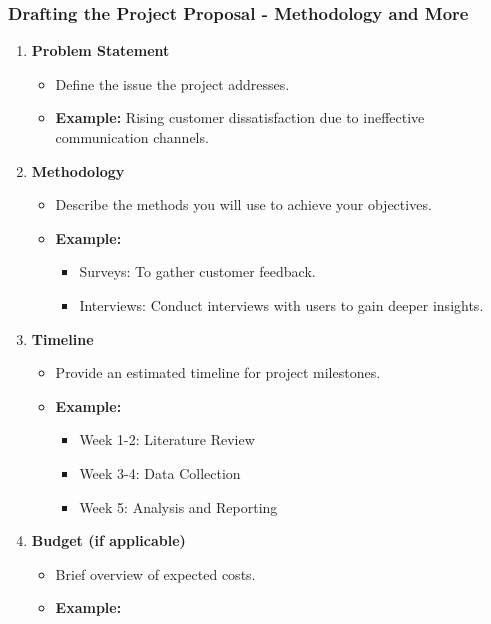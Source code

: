 \documentclass[aspectratio=169]{beamer}
\begin{document}
\begin{frame}[fragile]
    \frametitle{Drafting the Project Proposal - Methodology and More}
    \begin{enumerate}[resume]
        \item \textbf{Problem Statement}
            \begin{itemize}
                \item Define the issue the project addresses.
                \item \textbf{Example:} Rising customer dissatisfaction due to ineffective communication channels.
            \end{itemize}
        \item \textbf{Methodology}
            \begin{itemize}
                \item Describe the methods you will use to achieve your objectives.
                \item \textbf{Example:}
                \begin{itemize}
                    \item Surveys: To gather customer feedback.
                    \item Interviews: Conduct interviews with users to gain deeper insights.
                \end{itemize}
            \end{itemize}
        \item \textbf{Timeline}
            \begin{itemize}
                \item Provide an estimated timeline for project milestones.
                \item \textbf{Example:}
                \begin{itemize}
                    \item Week 1-2: Literature Review
                    \item Week 3-4: Data Collection
                    \item Week 5: Analysis and Reporting
                \end{itemize}
            \end{itemize}
        \item \textbf{Budget (if applicable)}
            \begin{itemize}
                \item Brief overview of expected costs.
                \item \textbf{Example:}

\end{itemize}
\end{enumerate}
\end{frame}
\end{document}
